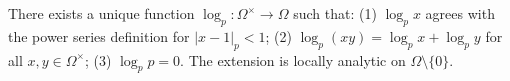 There exists a unique function $\log_p: \Omega^\times \to \Omega$ such that: (1) $\log_p x$ agrees with the power series definition for $|x-1|_p < 1$; (2) $\log_p(xy) = \log_p x + \log_p y$ for all $x,y \in \Omega^\times$; (3) $\log_p p = 0$. The extension is locally analytic on $\Omega \setminus \{0\}$.